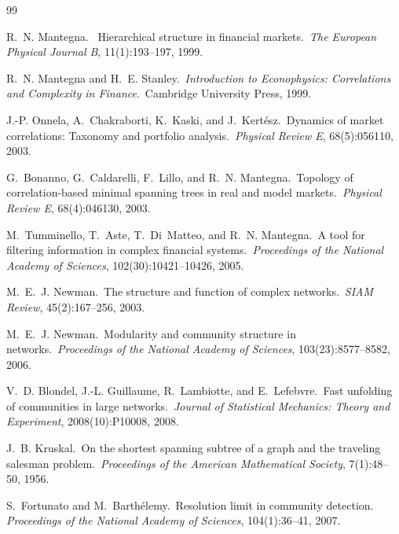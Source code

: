 \documentclass[11pt,a4paper]{article}
\theoremstyle{definition}
\begin{document}
\begin{thebibliography}{99}\small
\setlength{\itemsep}{2pt}\setlength{\parsep}{0pt}

 R.~N. Mantegna.\ \newblock
Hierarchical structure in financial markets.\ \newblock \emph{The
European Physical Journal B}, 11(1):193--197, 1999.

 R.~N. Mantegna and H.~E. Stanley.\
\newblock \emph{Introduction to Econophysics: Correlations and
Complexity in Finance}.\ \newblock Cambridge University Press, 1999.

 J.-P. Onnela, A.~Chakraborti, K.~Kaski,
and J.~Kert\'esz.\ \newblock Dynamics of market correlations: Taxonomy
and portfolio analysis.\ \newblock \emph{Physical Review E},
68(5):056110, 2003.

 G.~Bonanno, G.~Caldarelli, F.~Lillo, and
R.~N. Mantegna.\ \newblock Topology of correlation-based minimal
spanning trees in real and model markets.\ \newblock \emph{Physical
Review E}, 68(4):046130, 2003.

 M.~Tumminello, T.~Aste, T.~Di~Matteo, and
R.~N. Mantegna.\ \newblock A tool for filtering information in complex
financial systems.\ \newblock \emph{Proceedings of the National
Academy of Sciences}, 102(30):10421--10426, 2005.

 M.~E.~J. Newman.\ \newblock The structure
and function of complex networks.\ \newblock \emph{SIAM Review},
45(2):167--256, 2003.

 M.~E.~J. Newman.\ \newblock Modularity
and community structure in networks.\ \newblock \emph{Proceedings of
the National Academy of Sciences}, 103(23):8577--8582, 2006.

 V.~D. Blondel, J.-L. Guillaume,
R.~Lambiotte, and E.~Lefebvre.\ \newblock Fast unfolding of communities
in large networks.\ \newblock \emph{Journal of Statistical Mechanics:
Theory and Experiment}, 2008(10):P10008, 2008.

 J.~B. Kruskal.\ \newblock On the shortest
spanning subtree of a graph and the traveling salesman problem.\
\newblock \emph{Proceedings of the American Mathematical Society},
7(1):48--50, 1956.

 S.~Fortunato and M.~Barth\'elemy.\
\newblock Resolution limit in community detection.\ \newblock
\emph{Proceedings of the National Academy of Sciences},
104(1):36--41, 2007.


\end{thebibliography}
\end{document}
